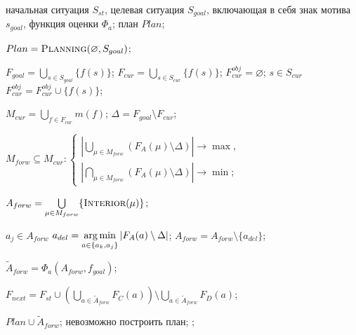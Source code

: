	\Require начальная ситуация $S_{st}$, целевая ситуация $S_{goal}$, включающая в себя знак мотива $s_{goal}$, функция оценки $\Phi_a$;
	\Ensure план $Plan$;
	\algrule

	\State $Plan=\Call{Planning}{\varnothing,S_{goal}}$;

		\State $F_{goal}=\bigcup\limits_{s\in S_{goal}}\{f(s)\}$; 
		\State $F_{cur}=\bigcup\limits_{s\in S_{cur}}\{f(s)\}$; 
		\State $F_{cur}^{obj}=\varnothing$; 
		\ForAll $s\in S_{cur}$
				\State $F_{cur}^{obj}= F_{cur}^{obj}\cup\{f(s)\}$; 
			\EndIf
		\EndFor
		
		\State $M_{cur}=\bigcup\limits_{f\in F_{cur}}m(f)$;
		\State $\Delta=F_{goal}\setminus F_{cur}$; 
		
		\State $M_{forw}\subseteq M_{cur}:\begin{cases}
			\left|\bigcup\limits_{\mu\in M_{forw}}\left(F_A(\mu)\setminus\Delta\right)\right|\rightarrow\max,\\
			\left|\bigcap\limits_{\mu\in M_{forw}}\left(F_A(\mu)\setminus\Delta\right)\right|\rightarrow\min;
		\end{cases}$ 
		
		\State $A_{forw} = \bigcup\limits_{\mu\in M_{forw}}\{\Call{Interior}{\mu}\}$; 
				
		\ForAll $a_j\in A_{forw}$
				\State $a_{del}=\operatorname*{arg\,min}\limits_{a\in\{a_k,a_j\}}|F_A(a)\setminus\Delta|$;
				\State $A_{forw}= A_{forw}\setminus\{a_{del}\}$; 
			\EndIf
		\EndFor
		
		\State $\tilde A_{forw}=\Phi_a(A_{forw},f_{goal})$; 
		
		\State $F_{next}=F_{st}\cup\left(\bigcup\limits_{a\in \tilde A_{forw}}F_C(a)\right)\setminus\bigcup\limits_{a\in \tilde A_{forw}}F_D(a)$; 
		
			\State \Return $Plan\cup{\tilde A_{forw}}$;		
		\Else
				\State\Return невозможно построить план;
			\Else
				\State \Return {};						
			\EndIf
		\EndIf

	\EndFunction